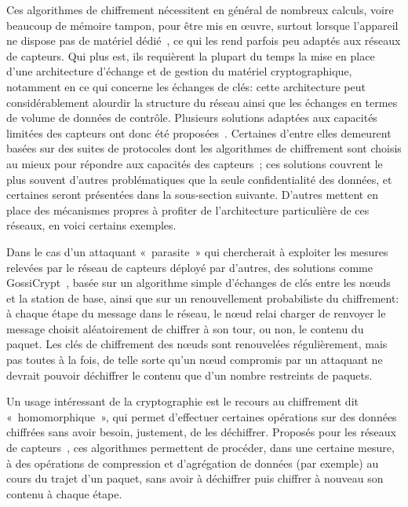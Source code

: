 Ces algorithmes de chiffrement nécessitent en général de nombreux calculs, voire beaucoup de mémoire tampon, pour être mis en œuvre, surtout lorsque l'appareil ne dispose pas de matériel dédié~\cite{PLP06}, ce qui les rend parfois peu adaptés aux réseaux de capteurs.
Qui plus est, ils requièrent la plupart du temps la mise en place d'une architecture d'échange et de gestion du matériel cryptographique, notamment en ce qui concerne les échanges de clés: cette architecture peut considérablement alourdir la structure du réseau ainsi que les échanges en termes de volume de données de contrôle.
Plusieurs solutions adaptées aux capacités limitées des capteurs ont donc été proposées~\cite{OX09}.
Certaines d'entre elles demeurent basées sur des suites de protocoles dont les algorithmes de chiffrement sont choisis au mieux pour répondre aux capacités des capteurs~\cite{SOBMCN11,KR12}; ces solutions couvrent le plus souvent d'autres problématiques que la seule confidentialité des données, et certaines seront présentées dans la sous-section suivante.
D'autres mettent en place des mécanismes propres à profiter de l'architecture particulière de ces réseaux, en voici certains exemples.

Dans le cas d'un attaquant « parasite » qui chercherait à exploiter les mesures relevées par le réseau de capteurs déployé par d'autres, des solutions comme GossiCrypt~\cite{LPH08}, basée sur un algorithme simple d'échanges de clés entre les nœuds et la station de base, ainsi que sur un renouvellement probabiliste du chiffrement: à chaque étape du message dans le réseau, le nœud relai charger de renvoyer le message choisit aléatoirement de chiffrer à son tour, ou non, le contenu du paquet.
Les clés de chiffrement des nœuds sont renouvelées régulièrement, mais pas toutes à la fois, de telle sorte qu'un nœud compromis par un attaquant ne devrait pouvoir déchiffrer le contenu que d'un nombre restreints de paquets.

Un usage intéressant de la cryptographie est le recours au chiffrement dit « homomorphique », qui permet d'effectuer certaines opérations sur des données chiffrées sans avoir besoin, justement, de les déchiffrer.
Proposés pour les réseaux de capteurs~\cite{BBTY14}, ces algorithmes permettent de procéder, dans une certaine mesure, à des opérations de compression et d'agrégation de données (par exemple) au cours du trajet d'un paquet, sans avoir à déchiffrer puis chiffrer à nouveau son contenu à chaque étape.


